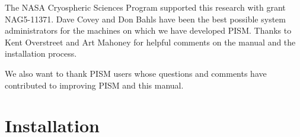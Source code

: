 \documentclass[11pt,final]{amsart}
\begin{document}
The NASA Cryospheric Sciences Program supported this research with grant NAG5-11371.  Dave Covey and Don Bahls have been the best possible system administrators for the machines on which we have developed PISM.  Thanks to Kent Overstreet and Art Mahoney for helpful comments on the manual and the installation process.

We also want to thank PISM users whose questions and comments have contributed to improving PISM and this manual.

\newpage
\setcounter{tocdepth}{2}
\tableofcontents


\newpage
\section{Installation}\label{sect:install}

\renewcommand{\labelenumi}{\textbf{\arabic{enumi}.}~}
\end{document}
